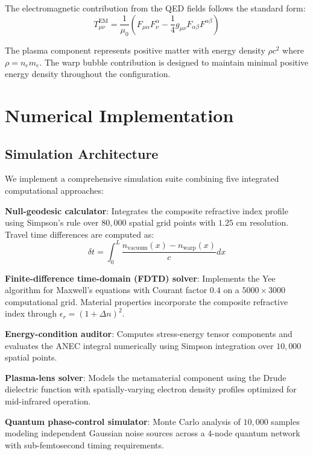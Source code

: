 \documentclass[aps,prl,reprint,groupedaddress]{revtex4-1}
\begin{document}
The electromagnetic contribution from the QED fields follows the standard form:
\begin{equation}
T_{\mu\nu}^{\text{EM}} = \frac{1}{\mu_0}\left(F_{\mu\alpha}F_\nu^\alpha - \frac{1}{4}g_{\mu\nu}F_{\alpha\beta}F^{\alpha\beta}\right)
\end{equation}

The plasma component represents positive matter with energy density $\rho c^2$ where $\rho = n_e m_e$. The warp bubble contribution is designed to maintain minimal positive energy density throughout the configuration.

\section{Numerical Implementation}

\subsection{Simulation Architecture}

We implement a comprehensive simulation suite combining five integrated computational approaches:

\textbf{Null-geodesic calculator}: Integrates the composite refractive index profile using Simpson's rule over $80,000$ spatial grid points with $1.25$ cm resolution. Travel time differences are computed as:
\begin{equation}
\delta t = \int_0^L \frac{n_{\text{vacuum}}(x) - n_{\text{warp}}(x)}{c} dx
\end{equation}

\textbf{Finite-difference time-domain (FDTD) solver}: Implements the Yee algorithm for Maxwell's equations with Courant factor $0.4$ on a $5000 \times 3000$ computational grid. Material properties incorporate the composite refractive index through $\epsilon_r = (1 + \Delta n)^2$.

\textbf{Energy-condition auditor}: Computes stress-energy tensor components and evaluates the ANEC integral numerically using Simpson integration over $10,000$ spatial points.

\textbf{Plasma-lens solver}: Models the metamaterial component using the Drude dielectric function with spatially-varying electron density profiles optimized for mid-infrared operation.

\textbf{Quantum phase-control simulator}: Monte Carlo analysis of $10,000$ samples modeling independent Gaussian noise sources across a $4$-node quantum network with sub-femtosecond timing requirements.
\end{document}
